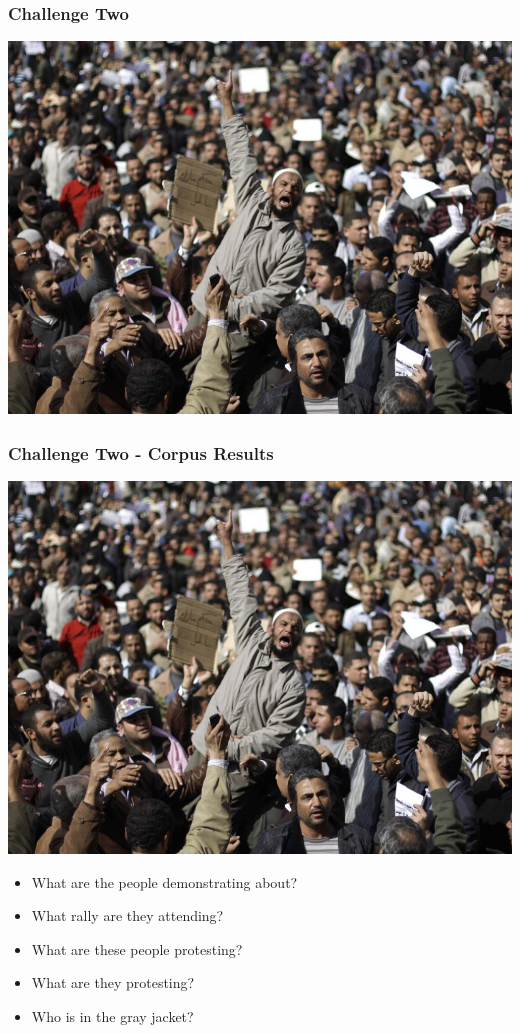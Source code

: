 \documentclass[xcolor=dvipsnames]{beamer}
\begin{document}
		
		\begin{frame}
			\frametitle{Challenge Two}
			\includegraphics[width=\textwidth]{images/01c-egyptian-protests.jpg}
		\end{frame}
		
		\begin{frame}
			\frametitle{Challenge Two - Corpus Results}
			\centering
			\includegraphics[scale=0.15]{images/01c-egyptian-protests.jpg}
			\begin{itemize}
				\item What are the people demonstrating about?
				\item What rally are they attending?
				\item What are these people protesting?
				\item What are they protesting?
				\item Who is in the gray jacket?
			\end{itemize}
		\end{frame}
	
\end{document}
